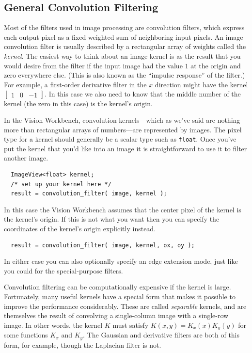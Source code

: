 \subsection{General Convolution Filtering}

Most of the filters used in image processing are convolution filters,
which express each output pixel as a fixed weighted sum of neighboring
input pixels.  An image convolution filter is usually described by a
rectangular array of weights called the {\it kernel}.  The easiest way
to think about an image kernel is as the result that you would desire 
from the filter if the input image had the value $1$ at the origin and
zero everywhere else.  (This is also known as the ``impulse response''
of the filter.)  For example, a first-order derivative filter in the
$x$ direction might have the kernel
$[\begin{array}{ccc} 1 & 0 & -1 \end{array}]$.
In this case we also need to know that the middle number of the kernel 
(the zero in this case) is the kernel's origin.

In the Vision Workbench, convolution kernels---which as we've said are 
nothing more than rectangular arrays of numbers---are represented by 
images.  The pixel type for a kernel should generally be a scalar type 
such as \verb#float#.  Once you've put the kernel that you'd like into 
an image it is straightforward to use it to filter another image.
\begin{verbatim}
  ImageView<float> kernel;
  /* set up your kernel here */
  result = convolution_filter( image, kernel );
\end{verbatim}
In this case the Vision Workbench assumes that the center pixel of the
kernel is the kernel's origin.  If this is not what you want then you
can specify the coordinates of the kernel's origin explicitly instead.
\begin{verbatim}
  result = convolution_filter( image, kernel, ox, oy );
\end{verbatim}
In either case you can also optionally specify an edge extension mode, 
just like you could for the special-purpose filters.

Convolution filtering can be computationally expensive if the kernel
is large.  Fortunately, many useful kernels have a special form that
makes it possible to improve the performance considerably.  These are
called {\it separable} kernels, and are themselves the result of
convolving a single-column image with a single-row image.  In other
words, the kernel $K$ must satisfy $K(x,y)=K_x(x)K_y(y)$ for some
functions $K_x$ and $K_y$.  The Gaussian and derivative filters
are both of this form, for example, though the Laplacian filter is
not.

